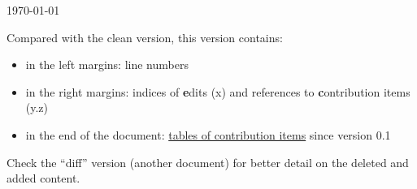 \setcounter{page}{-1}

\vspace{5.3em}
\begingroup\nolinenumbers\centering
{}

\scalebox{1.25}{in the ZKProof Community Reference version 0.2}


\vspace{1em}
\today


\raggedright
\vspace{2em}
Compared with the clean version, this version contains:
\vspace{.5em}\begin{itemize}\setlength{\itemsep}{.5em}
\item in the left margins: line numbers
\item in the right margins: indices of \textbf{e}dits (\textbf{}x) and references to \textbf{c}ontribution items (\textbf{}y.z)
\item in the end of the document: \hyperref[app:table-comments]{tables of contribution items} since version 0.1
\end{itemize}

\vspace{2em}
Check the ``diff'' version (another document) for better detail on the deleted and added content.


\vfill
\renewcommand\cftloctitlefont{\bfseries\LARGE}
\listofcontribution

\endgroup
\thispagestyle{empty}

\clearpage\null\thispagestyle{intentionallyblank}\clearpage
